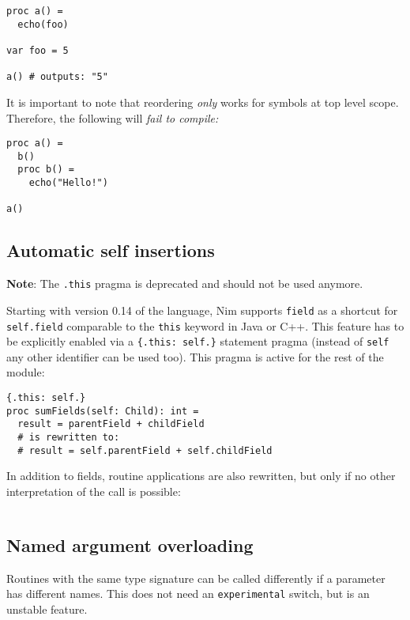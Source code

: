 \begin{verbatim}
proc a() =
  echo(foo)

var foo = 5

a() # outputs: "5"
\end{verbatim}

It is important to note that reordering \emph{only} works for symbols at
top level scope. Therefore, the following will \emph{fail to compile:}

\begin{verbatim}
proc a() =
  b()
  proc b() =
    echo("Hello!")

a()
\end{verbatim}

\hypertarget{automatic-self-insertions}{%
\subsection{Automatic self insertions}\label{automatic-self-insertions}}

\textbf{Note}: The \texttt{.this} pragma is deprecated and should not be
used anymore.

Starting with version 0.14 of the language, Nim supports \texttt{field}
as a shortcut for \texttt{self.field} comparable to the \texttt{this}
keyword in Java or C++. This feature has to be explicitly enabled via a
\texttt{\{.this:\ self.\}} statement pragma (instead of \texttt{self}
any other identifier can be used too). This pragma is active for the
rest of the module:

\begin{verbatim}
{.this: self.}
proc sumFields(self: Child): int =
  result = parentField + childField
  # is rewritten to:
  # result = self.parentField + self.childField
\end{verbatim}

In addition to fields, routine applications are also rewritten, but only
if no other interpretation of the call is possible:

\begin{verbatim}
\end{verbatim}

\hypertarget{named-argument-overloading}{%
\subsection{Named argument
overloading}\label{named-argument-overloading}}

Routines with the same type signature can be called differently if a
parameter has different names. This does not need an
\texttt{experimental} switch, but is an unstable feature.

